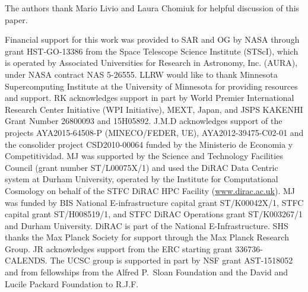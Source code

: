
\begin{acknowledgments}
The authors thank Mario Livio and Laura Chomiuk for helpful discussion
of this paper.

Financial support for this work was provided to SAR and OG by NASA
through grant HST-GO-13386 from the Space Telescope Science Institute
(STScI), which is operated by Associated Universities for Research in
Astronomy, Inc. (AURA), under NASA contract NAS 5-26555. LLRW would
like to thank Minnesota Supercomputing Institute at the University of
Minnesota for providing resources and support.  RK acknowledges
support in part by World Premier International Research Center
Initiative (WPI Initiative), MEXT, Japan, and JSPS KAKENHI Grant
Number 26800093 and 15H05892.  J.M.D acknowledges support of the
projects AYA2015-64508-P (MINECO/FEDER, UE), AYA2012-39475-C02-01 and
the consolider project CSD2010-00064 funded by the Ministerio de
Economia y Competitividad.  MJ was supported by the Science and
Technology Facilities Council (grant number ST/L00075X/1) and used the
DiRAC Data Centric system at Durham University, operated by the
Institute for Computational Cosmology on behalf of the STFC DiRAC HPC
Facility (\url{www.dirac.ac.uk}).  MJ was funded by BIS National
E-infrastructure capital grant ST/K00042X/1, STFC capital grant
ST/H008519/1, and STFC DiRAC Operations grant ST/K003267/1 and Durham
University. DiRAC is part of the National E-Infrastructure.  SHS
thanks the Max Planck Society for support through the Max Planck
Research Group. JR acknowledges support from the ERC starting grant
336736-CALENDS. The UCSC group is supported in part by NSF grant
AST-1518052 and from fellowships from the Alfred P.\ Sloan Foundation
and the David and Lucile Packard Foundation to R.J.F.


\end{acknowledgments}
